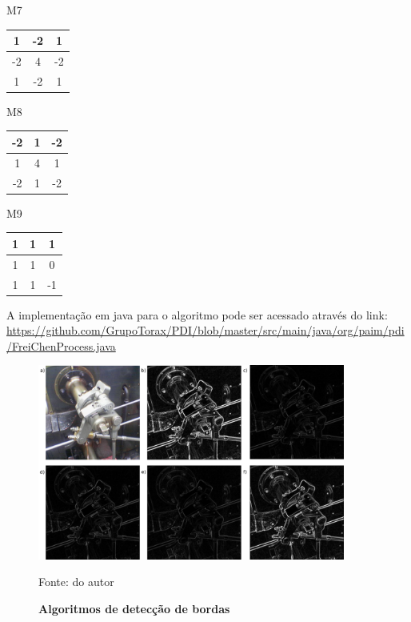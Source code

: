 \documentclass[
	12pt,				%
	oneside,			%
	a4paper,			%
	english,			%
	french,				%
	spanish,			%
	brazil,				%
	]{abntex2}
\begin{document}
\begin{center}
M7
\begin{tabular}{|c|c|c|}
    \hline
                 1 &            -2 &  1              \\ \hline
	            -2 &             4 & -2              \\ \hline   
	             1 &            -2 &  1              \\ \hline   
\end{tabular}
M8
\begin{tabular}{|c|c|c|}
    \hline
     	 	 	-2 &             1 & -2              \\ \hline
	             1 &             4 &  1             \\ \hline   
	            -2 &             1 & -2             \\ \hline   
\end{tabular}
M9
\begin{tabular}{|c|c|c|}
    \hline
     	 	 	 1 &             1 &  1            \\ \hline
	             1 &             1 &  0             \\ \hline   
	             1 &             1 & -1             \\ \hline   
\end{tabular}
\end{center}

A implementação em java para o algoritmo pode ser acessado através do link:
\url{https://github.com/GrupoTorax/PDI/blob/master/src/main/java/org/paim/pdi/FreiChenProcess.java}

\begin{figure}[ht]
\centering
\caption{\textbf{Algoritmos de detecção de bordas}}
\includegraphics[width=0.9\textwidth]{imagens/deteccao_bordas.png}

Fonte: do autor
\label{fig:deteccao_bordas}
\end{figure}
\end{document}
